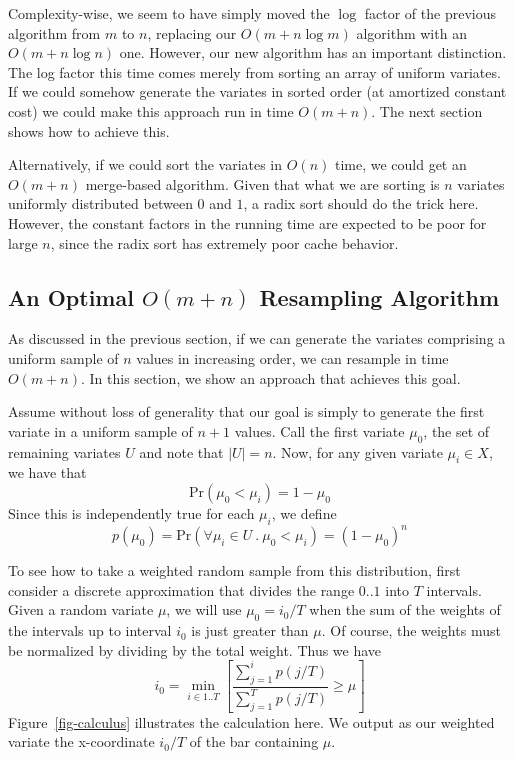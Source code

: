 \documentclass[12pt]{article}
\newcommand{\Prob}{\text{Pr}}
\begin{document}
  Complexity-wise, we seem to have simply moved the $\log$
  factor of the previous algorithm from $m$ to $n$,
  replacing our $O(m + n \log m)$ algorithm with an $O(m + n
  \log n)$ one.  However, our new algorithm has an important
  distinction.  The log factor this time comes merely from
  sorting an array of uniform variates.  If we could somehow
  generate the variates in sorted order (at amortized
  constant cost) we could make this approach run in time
  $O(m + n)$.  The next section shows how to achieve this.

  Alternatively, if we could sort the variates in $O(n)$
  time, we could get an $O(m + n)$ merge-based algorithm.
  Given that what we are sorting is $n$ variates uniformly
  distributed between $0$ and $1$, a radix sort should do
  the trick here.  However, the constant factors in the running
  time are expected to be poor for large $n$, since the
  radix sort has extremely poor cache behavior.

\subsection{An Optimal $O(m + n)$ Resampling Algorithm}\label{sec-optimal}

  As discussed in the previous section, if we can generate
  the variates comprising a uniform sample of $n$ values in
  increasing order, we can resample in time $O(m + n)$.  In
  this section, we show an approach that achieves this
  goal.

  Assume without loss of generality that our goal is simply
  to generate the first variate in a uniform sample of $n +
  1$ values.  Call the first variate $\mu_0$, the set of
  remaining variates $U$ and note that $|U|=n$.  Now, for
  any given variate $\mu_i \in X$, we have that
    $$ \Prob(\mu_0 < \mu_i) = 1 - \mu_0 $$
  Since this is independently true for each $\mu_i$, we define
    $$p(\mu_0) = \Prob(\forall \mu_i \in U ~.~ \mu_0 < \mu_i) = (1 - \mu_0)^n$$
  
  To see how to take a weighted random sample from this
  distribution, first consider a discrete approximation that
  divides the range $0..1$ into $T$ intervals.  Given a
  random variate $\mu$, we will use $\mu_0=i_0/T$ when
  the sum of the weights of the intervals up to interval $i_0$
  is just greater than $\mu$.  Of course, the weights must be
  normalized by dividing by the total weight.  Thus we have
    $$i_0=\min_{i\in1..T}\left[{\frac{\sum_{j=1}^{i}{p(j/T)}}
                         {\sum_{j=1}^{T}{p(j/T)}} \ge \mu}\right]$$
  Figure~\ref{fig-calculus} illustrates the calculation
  here.  We output as our weighted variate the
  x-coordinate $i_0/T$ of the bar containing $\mu$.
\end{document}
